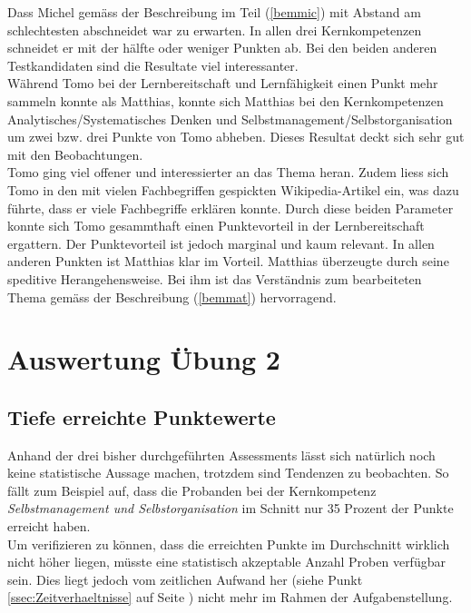 Dass Michel gemäss der Beschreibung im Teil (\ref{bemmic}) mit Abstand am schlechtesten abschneidet war zu erwarten. In allen drei Kernkompetenzen schneidet er mit der hälfte oder weniger Punkten ab. Bei den beiden anderen Testkandidaten sind die Resultate viel interessanter. \\
Während Tomo bei der Lernbereitschaft und Lernfähigkeit einen Punkt mehr sammeln konnte als Matthias, konnte sich Matthias bei den Kernkompetenzen Analytisches/Systematisches Denken und Selbstmanagement/Selbstorganisation um zwei bzw. drei Punkte von Tomo abheben. Dieses Resultat deckt sich sehr gut mit den Beobachtungen. \\
Tomo ging viel offener und interessierter an das Thema heran. Zudem liess sich Tomo in den mit vielen Fachbegriffen gespickten Wikipedia-Artikel ein, was dazu führte, dass er viele Fachbegriffe erklären konnte. Durch diese beiden Parameter konnte sich Tomo gesammthaft einen Punktevorteil in der Lernbereitschaft ergattern. Der Punktevorteil ist jedoch marginal und kaum relevant. In allen anderen Punkten ist Matthias klar im Vorteil. Matthias überzeugte durch seine speditive Herangehensweise. Bei ihm ist das Verständnis zum bearbeiteten Thema gemäss der Beschreibung (\ref{bemmat}) hervorragend. 

\section{Auswertung Übung 2}

\subsection{Tiefe erreichte Punktewerte}

Anhand der drei bisher durchgeführten Assessments lässt sich natürlich noch keine statistische Aussage machen, trotzdem sind Tendenzen zu beobachten. So fällt zum Beispiel auf, dass die Probanden bei der Kernkompetenz \textit{Selbstmanagement und Selbstorganisation} im Schnitt nur 35 Prozent der Punkte erreicht haben.\\
Um verifizieren zu können, dass die erreichten Punkte im Durchschnitt wirklich nicht höher liegen, müsste eine statistisch akzeptable Anzahl Proben verfügbar sein. Dies liegt jedoch vom zeitlichen Aufwand her (siehe Punkt \ref{ssec:Zeitverhaeltnisse} auf Seite \pageref{ssec:Zeitverhaeltnisse}) nicht mehr im Rahmen der Aufgabenstellung.
